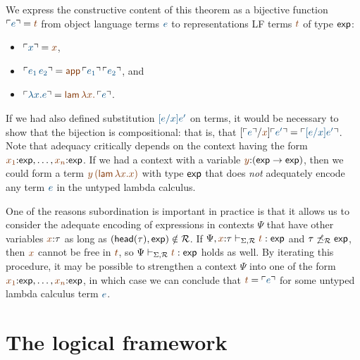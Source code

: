We express the constructive content of this theorem as a bijective
function $\interp{e} = \lf{t}$ from object language terms $\obj{e}$ to
representations LF terms $\lf{t}$ of type ${\sf exp}$:
\smallskip
\begin{itemize}
\item $\interp{x} = \lf{x}$, 
\item $\interp{e_1\,e_2} = \lf{{\sf
    app}\,\interp{e_1}\,\interp{e_2}}$, and
\item  $\interp{\lambda x.e} =
\lf{{\sf lam}\,\lambda x.\,\interp{e}}$.
\end{itemize}
\smallskip If we had also defined
substitution $\obj{[e/x]e'}$ on terms, it would be necessary to show
that the bijection is compositional: that is, that
$[\interp{e}/\lf{x}]\interp{e'} = \interp{[e/x]e'}$.  Note that
adequacy critically depends on the context having the form
$\lf{x_1}{:}{\sf exp},\ldots,\lf{x_n}{:}{\sf exp}$. If we had a
context with a variable $\lf{y}{:}({\sf exp} \rightarrow {\sf exp})$,
then we could form a term $\lf{y\,({\sf lam}\,\lambda x. x)}$ with
type ${\sf exp}$ that does {\it not} adequately encode any term
$\obj{e}$ in the untyped lambda calculus.

One of the reasons subordination is important in practice is that it
allows us to consider the adequate encoding of expressions in contexts
$\Psi$ that have other variables $\lf{x}{:}\tau$ as long as $({\sf
  head}(\tau),{\sf exp}) \notin \mathcal R$. If $\Psi,\lf{x}{:}\tau
\vdash_{\Sigma,\subord} \lf{t} : {\sf exp}$ and $\tau
\not\preceq_\mathcal R {\sf exp}$, then $\lf{x}$ cannot be free in
$\lf{t}$, so $\Psi \vdash_{\Sigma,\subord} \lf{t} : {\sf exp}$ holds as
well. By iterating this procedure, it may be possible to strengthen a
context $\Psi$ into one of the form $\lf{x_1}{:}{\sf
  exp},\ldots,\lf{x_n}{:}{\sf exp}$, in which case we can conclude
that $\lf t = \interp{e}$ for some untyped lambda calculus term $\obj
e$.



\section{The logical framework \sls}
\label{sec:slsframework}

